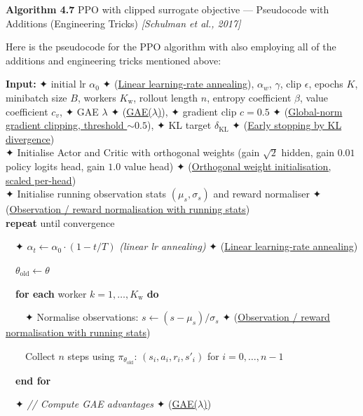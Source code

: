 \documentclass[11pt]{article}
\begin{document}
    \begin{pseudobox}

\textbf{Algorithm 4.7} PPO with clipped surrogate objective ---
Pseudocode with Additions (Engineering Tricks) \emph{{[}Schulman et al.,
2017{]}}

\tcbline

Here is the pseudocode for the PPO algorithm with also employing all of
the additions and engineering tricks mentioned above:

\textbf{Input:} ✦ initial lr \(\alpha_0\) ✦
(\hyperref[trick-4-7-6]{Linear learning-rate annealing}), \(\alpha_w\),
\(\gamma\), clip \(\epsilon\), epochs \(K\), minibatch size \(B\),
workers \(K_{\text{w}}\), rollout length \(n\), entropy coefficient
\(\beta\), value coefficient \(c_v\), ✦ GAE \(\lambda\) ✦
(\hyperref[trick-4-7-1]{GAE(\(\lambda\))}), ✦ gradient clip \(c = 0.5\)
✦ (\hyperref[trick-4-7-4]{Global-norm gradient clipping, threshold
\(\sim 0.5\)}), ✦ KL target \(\delta_\text{KL}\) ✦
(\hyperref[trick-4-7-8]{Early stopping by KL divergence})\\
✦ Initialise Actor and Critic with orthogonal weights (gain \(\sqrt{2}\)
hidden, gain \(0.01\) policy logits head, gain \(1.0\) value head) ✦
(\hyperref[trick-4-7-5]{Orthogonal weight initialisation, scaled
per-head})\\
✦ Initialise running observation stats \((\mu_s,\sigma_s)\) and reward
normaliser ✦ (\hyperref[trick-4-7-7]{Observation / reward normalisation
with running stats})\\
\textbf{repeat} until convergence\\
\strut ~~✦ \(\alpha_t \leftarrow \alpha_0 \cdot (1 - t/T)\)
\emph{(linear lr annealing)} ✦ (\hyperref[trick-4-7-6]{Linear
learning-rate annealing})\\
\strut ~~\(\theta_{\text{old}} \leftarrow \theta\)\\
\strut ~~\textbf{for each} worker \(k = 1, \ldots, K_{\text{w}}\)
\textbf{do}\\
\strut ~~~~✦ Normalise observations:
\(s \leftarrow (s - \mu_s)/\sigma_s\) ✦
(\hyperref[trick-4-7-7]{Observation / reward normalisation with running
stats})\\
\strut ~~~~Collect \(n\) steps using \(\pi_{\theta_{\text{old}}}\):
\((s_i, a_i, r_i, s'_i)\) for \(i = 0, \ldots, n - 1\)\\
\strut ~~\textbf{end for}\\
\strut ~~✦ \emph{// Compute GAE advantages} ✦
(\hyperref[trick-4-7-1]{GAE(\(\lambda\))})\\

\end{pseudobox}
\end{document}
